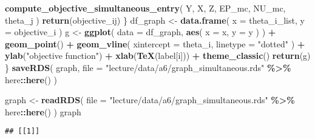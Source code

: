 \documentclass[
]{book}
\newenvironment{Shaded}{\begin{snugshade}}{\end{snugshade}}
\newcommand{\AttributeTok}[1]{\textcolor[rgb]{0.13,0.29,0.53}{#1}}
\newcommand{\FunctionTok}[1]{\textcolor[rgb]{0.13,0.29,0.53}{\textbf{#1}}}
\newcommand{\NormalTok}[1]{#1}
\newcommand{\OtherTok}[1]{\textcolor[rgb]{0.56,0.35,0.01}{#1}}
\newcommand{\SpecialCharTok}[1]{\textcolor[rgb]{0.81,0.36,0.00}{\textbf{#1}}}
\newcommand{\StringTok}[1]{\textcolor[rgb]{0.31,0.60,0.02}{#1}}
\begin{document}
\begin{Shaded}
\begin{Highlighting}[]
                 \FunctionTok{compute\_objective\_simultaneous\_entry}\NormalTok{(}
\NormalTok{                   Y, }
\NormalTok{                   X, }
\NormalTok{                   Z, }
\NormalTok{                   EP\_mc, }
\NormalTok{                   NU\_mc, }
\NormalTok{                   theta\_j}
\NormalTok{                   )}
               \FunctionTok{return}\NormalTok{(objective\_ij)}
\NormalTok{             \}}
\NormalTok{  df\_graph }\OtherTok{\textless{}{-}} 
    \FunctionTok{data.frame}\NormalTok{(}
      \AttributeTok{x =}\NormalTok{ theta\_i\_list, }
      \AttributeTok{y =}\NormalTok{ objective\_i}
\NormalTok{      ) }
\NormalTok{  g }\OtherTok{\textless{}{-}} 
    \FunctionTok{ggplot}\NormalTok{(}
    \AttributeTok{data =}\NormalTok{ df\_graph, }
    \FunctionTok{aes}\NormalTok{(}
      \AttributeTok{x =}\NormalTok{ x, }
      \AttributeTok{y =}\NormalTok{ y}
\NormalTok{      )}
\NormalTok{    ) }\SpecialCharTok{+} 
    \FunctionTok{geom\_point}\NormalTok{() }\SpecialCharTok{+}
    \FunctionTok{geom\_vline}\NormalTok{(}
      \AttributeTok{xintercept =}\NormalTok{ theta\_i, }
      \AttributeTok{linetype =} \StringTok{"dotted"}
\NormalTok{      ) }\SpecialCharTok{+}
    \FunctionTok{ylab}\NormalTok{(}\StringTok{"objective function"}\NormalTok{) }\SpecialCharTok{+} 
    \FunctionTok{xlab}\NormalTok{(}\FunctionTok{TeX}\NormalTok{(label[i])) }\SpecialCharTok{+} 
    \FunctionTok{theme\_classic}\NormalTok{()}
  \FunctionTok{return}\NormalTok{(g)}
\NormalTok{\}}
\FunctionTok{saveRDS}\NormalTok{(}
\NormalTok{  graph, }
  \AttributeTok{file =} \StringTok{"lecture/data/a6/graph\_simultaneous.rds"} \SpecialCharTok{\%\textgreater{}\%}\NormalTok{ here}\SpecialCharTok{::}\FunctionTok{here}\NormalTok{()}
\NormalTok{)}
\end{Highlighting}
\end{Shaded}

\begin{Shaded}
\begin{Highlighting}[]
\NormalTok{graph }\OtherTok{\textless{}{-}} 
  \FunctionTok{readRDS}\NormalTok{(}
    \AttributeTok{file =} \StringTok{"lecture/data/a6/graph\_simultaneous.rds"} \SpecialCharTok{\%\textgreater{}\%}\NormalTok{ here}\SpecialCharTok{::}\FunctionTok{here}\NormalTok{()}
\NormalTok{  )}
\NormalTok{graph}
\end{Highlighting}
\end{Shaded}

\begin{verbatim}
## [[1]]
\end{verbatim}
\end{document}
